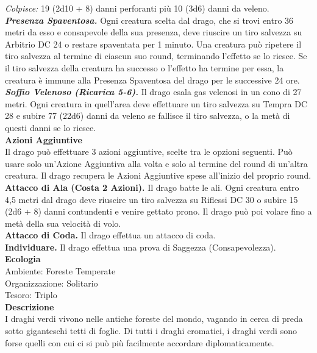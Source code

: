 \begin{multicols}{2}
\emph{Colpisce:} 19 (2d10 + 8) danni perforanti più 10 (3d6) danni da veleno.\\
\emph{\textbf{Presenza Spaventosa.}} Ogni creatura scelta dal drago, che si trovi entro 36 metri da esso e consapevole della sua presenza, deve riuscire un tiro salvezza su Arbitrio DC  24 o restare spaventata per 1 minuto. Una creatura può ripetere il tiro salvezza al termine di ciascun suo round, terminando l'effetto se lo riesce. Se il tiro salvezza della creatura ha successo o l'effetto ha termine per essa, la creatura è immune alla Presenza Spaventosa del drago per le successive 24 ore.\\
\emph{\textbf{Soffio Velenoso (Ricarica 5-6).}} Il drago esala gas velenosi in un cono di 27 metri. Ogni creatura in quell'area deve effettuare un tiro salvezza su Tempra DC  28 e subire 77 (22d6) danni da veleno se fallisce il tiro salvezza, o la metà di questi danni se lo riesce.\\
\textbf{Azioni Aggiuntive}\\
Il drago può effettuare 3 azioni aggiuntive, scelte tra le opzioni seguenti. Può usare solo un'Azione Aggiuntiva alla volta e solo al termine del round di un'altra creatura. Il drago recupera le Azioni Aggiuntive spese all'inizio del proprio round.\\
\textbf{Attacco di Ala (Costa 2 Azioni).} Il drago batte le ali. Ogni creatura entro 4,5 metri dal  drago deve riuscire un tiro salvezza su Riflessi DC  30 o subire 15 (2d6 + 8) danni contundenti e venire gettato prono. Il drago può poi volare fino a metà della sua velocità di volo. \\
\textbf{Attacco di Coda.} Il drago effettua un attacco di coda.\\
\textbf{Individuare.} Il drago effettua una prova di Saggezza (Consapevolezza).\\
\textbf{Ecologia}\\
Ambiente: Foreste Temperate\\
Organizzazione: Solitario\\
Tesoro: Triplo\\
\textbf{Descrizione}\\
I draghi verdi vivono nelle antiche foreste del mondo, vagando in cerca di preda sotto giganteschi tetti di foglie. Di tutti i draghi cromatici, i draghi verdi sono forse quelli con cui ci si può più facilmente accordare diplomaticamente.\\


\end{multicols}
